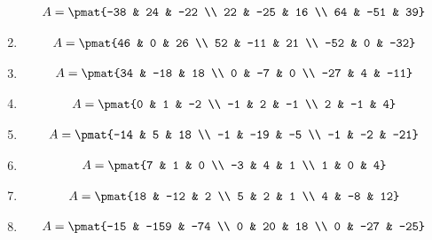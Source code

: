 \begin{enumerate}
\begin{align*}
A = \pmat{-38 & 24 & -22 \\ 22 & -25 & 16 \\ 64 & -51 & 39}
\end{align*}

\item

\begin{align*}
A = \pmat{46 & 0 & 26 \\ 52 & -11 & 21 \\ -52 & 0 & -32}
\end{align*}

\item

\begin{align*}
A = \pmat{34 & -18 & 18 \\ 0 & -7 & 0 \\ -27 & 4 & -11}
\end{align*}

\item

\begin{align*}
A = \pmat{0 & 1 & -2 \\ -1 & 2 & -1 \\ 2 & -1 & 4}
\end{align*}

\item

\begin{align*}
A = \pmat{-14 & 5 & 18 \\ -1 & -19 & -5 \\ -1 & -2 & -21}
\end{align*}

\item

\begin{align*}
A = \pmat{7 & 1 & 0 \\ -3 & 4 & 1 \\ 1 & 0 & 4}
\end{align*}

\item

\begin{align*}
A = \pmat{18 & -12 & 2 \\ 5 & 2 & 1 \\ 4 & -8 & 12}
\end{align*}

\item

\begin{align*}
A = \pmat{-15 & -159 & -74 \\ 0 & 20 & 18 \\ 0 & -27 & -25}
\end{align*}


\end{enumerate}
